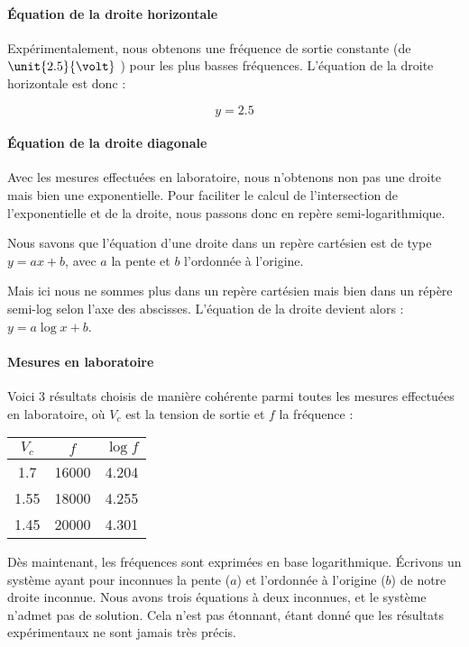 \paragraph{Équation de la droite horizontale}
Expérimentalement, nous obtenons une fréquence de sortie constante (de $\unit{2.5}{\volt}$ )
pour les plus basses fréquences. L'équation de la droite horizontale est donc :

$$y=2.5$$

\paragraph{Équation de la droite diagonale}

Avec les mesures effectuées en laboratoire, nous n'obtenons non pas une droite mais bien une exponentielle.
Pour faciliter le calcul de l'intersection de l'exponentielle et de la droite, nous passons donc en repère
semi-logarithmique.

Nous savons que l'équation d'une droite dans un repère cartésien est de type $y=ax+b$, avec $a$ la pente
et $b$ l'ordonnée à l'origine.

Mais ici nous ne sommes plus dans un repère cartésien mais bien dans un répère semi-log selon l'axe des
abscisses. L'équation de la droite devient alors : $y=a\log{x}+b$.

\paragraph{Mesures en laboratoire}

Voici 3 résultats choisis de manière cohérente parmi toutes les mesures effectuées en laboratoire, où
$V_c$ est la tension de sortie et $f$ la fréquence :

\begin{center}
\begin{tabular}{|c|c|c|}
\hline
$V_c$ & $f$ & $\log{f}$ \\
\hline
1.7 & 16000 & 4.204 \\
\hline
1.55 & 18000 & 4.255 \\
\hline
1.45 & 20000 & 4.301 \\
\hline
\end{tabular}
\end{center}

Dès maintenant, les fréquences sont exprimées en base logarithmique.
Écrivons un système ayant pour inconnues la pente ($a$) et l'ordonnée à l'origine ($b$) de notre droite
inconnue.
Nous avons trois équations à deux inconnues, et le système n'admet pas de solution.
Cela n'est pas étonnant, étant donné que les résultats expérimentaux ne sont jamais très précis.

